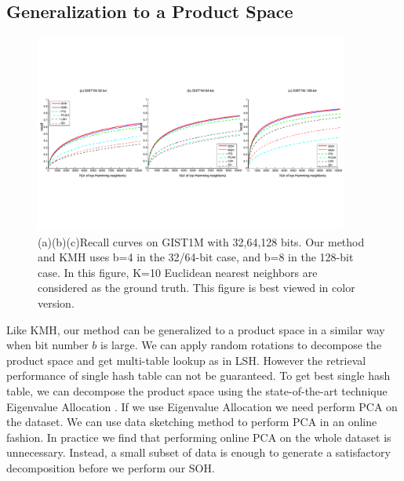 \documentclass{article}
\begin{document}
\subsection{Generalization to a Product Space}
\begin{figure}[t]
	\begin{center}
		\includegraphics[width=0.92\textwidth]{batch_compare_p}
		\caption{(a)(b)(c)Recall curves on GIST1M with 32,64,128 bits. Our method and KMH uses b=4 in the 32/64-bit case, and b=8 in the 128-bit case. In this figure, K=10 Euclidean nearest neighbors are considered as the ground truth. This figure is best viewed in color version.   }
		\label{batch_compare}
	\end{center}
\end{figure}
Like KMH, our method can be generalized to a product space in a similar way when bit number $b$ is large. We can apply random rotations to decompose the product space and get multi-table lookup as in LSH. However the retrieval performance of single hash table can not be guaranteed. To get best single hash table, we can decompose the
product space using the state-of-the-art technique Eigenvalue Allocation \cite{ge2014optimized}.
If we use Eigenvalue Allocation we need perform PCA on the dataset. We can use data sketching method \cite{leng2015online} to perform PCA in an online fashion.
In practice we find that performing online PCA on the whole dataset is unnecessary. Instead, a small subset of data is enough to generate a satisfactory decomposition before we perform our SOH.
\end{document}
